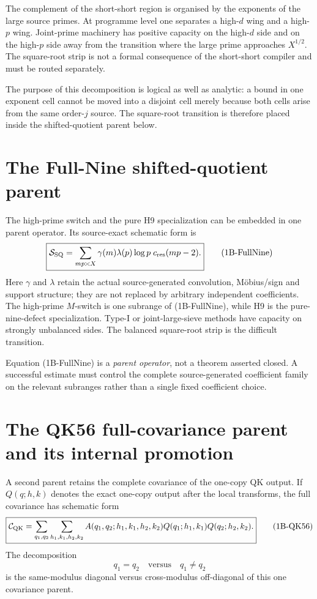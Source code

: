 \documentclass[11pt]{article}
\theoremstyle{definition}
\theoremstyle{remark}
\newcommand{\1}{\mathbf 1}
\begin{document}
The complement of the short-short region is organised by the exponents of the large source primes.  At programme
level one separates a high-$d$ wing and a high-$p$ wing.  Joint-prime machinery has positive capacity on the
high-$d$ side and on the high-$p$ side away from the transition where the large prime approaches $X^{1/2}$.
The square-root strip is not a formal consequence of the short-short compiler and must be routed separately.

The purpose of this decomposition is logical as well as analytic: a bound in one exponent cell cannot be moved
into a disjoint cell merely because both cells arise from the same order-$j$ source.  The square-root transition is
therefore placed inside the shifted-quotient parent below.

\section{The Full-Nine shifted-quotient parent}
\label{sec:g1b-fullnine}

The high-prime switch and the pure H9 specialization can be embedded in one parent operator.  Its source-exact
schematic form is
\[
 \boxed{
 \mathcal S_{\rm SQ}
 =\sum_{mp\asymp X}\gamma(m)\lambda(p)\log p\;c_{\rm res}(mp-2).}
\tag{1B-FullNine}
\]
Here $\gamma$ and $\lambda$ retain the actual source-generated convolution, M\"obius/sign and support structure;
they are not replaced by arbitrary independent coefficients.  The high-prime $M$-switch is one subrange of
(1B-FullNine), while H9 is the pure-nine-defect specialization.  Type-I or joint-large-sieve methods have capacity
on strongly unbalanced sides.  The balanced square-root strip is the difficult transition.

Equation (1B-FullNine) is a \emph{parent operator}, not a theorem asserted closed.  A successful estimate must
control the complete source-generated coefficient family on the relevant subranges rather than a single fixed
coefficient choice.

\section{The QK56 full-covariance parent and its internal promotion}
\label{sec:g1b-qk56}

A second parent retains the complete covariance of the one-copy QK output.  If $Q(q;h,k)$ denotes the exact
one-copy output after the local transforms, the full covariance has schematic form
\[
 \boxed{
 \mathcal C_{\rm QK}
 =\sum_{q_1,q_2}\sum_{h_1,k_1,h_2,k_2}
 A(q_1,q_2;h_1,k_1,h_2,k_2)
 Q(q_1;h_1,k_1)Q(q_2;h_2,k_2).}
\tag{1B-QK56}
\]
The decomposition
\[
 \boxed{q_1=q_2\quad\text{versus}\quad q_1\ne q_2}
\tag{1B-QKsplit}
\]
is the same-modulus diagonal versus cross-modulus off-diagonal of this one covariance parent.
\end{document}
